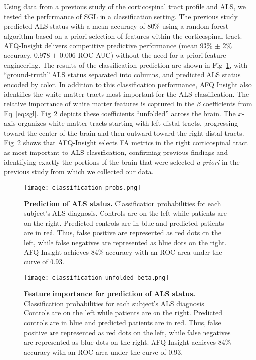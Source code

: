 Using data from a previous study of the corticospinal tract profile and
ALS\cite{sarica2017corticospinal}, we tested the performance of SGL in a
classification setting. The previous study predicted ALS status with a mean
accuracy of 80\% using a random forest algorithm based on a priori selection of
features within the corticospinal tract. AFQ-Insight delivers competitive
predictive performance (mean 93\% $\pm$ 2\% accuracy, 0.978 $\pm$ 0.006 ROC
AUC) without the need for a priori feature engineering. The results of the
classification prediction are shown in Fig~\ref{fig:class-results}, with
``ground-truth'' ALS status separated into columns, and predicted ALS status
encoded by color. In addition to this classification performance, AFQ Insight
also identifies the white matter tracts most important for the ALS
classification. The relative importance of white matter features is captured in
the $\beta$ coefficients from Eq~\eqref{eq:sgl}. Fig~\ref{fig:class-beta}
depicts these coefficients ``unfolded'' across the brain. The $x$-axis organizes
white matter tracts starting with left distal tracts, progressing toward the
center of the brain and then outward toward the right distal tracts.
Fig~\ref{fig:class-beta} shows that AFQ-Insight selects FA metrics in the right
corticospinal tract as most important to ALS classification, confirming previous
findings\cite{van2011upper, toosy2003diffusion, sarica2014tractography,
sage2007quantitative, sage2009quantitative, karlsborg2004corticospinal,
ellis1999diffusion, cosottini2005diffusion, ciccarelli2009investigation,
abe2010voxel} and identifying exactly the portions of the brain that were
selected \emph{a priori} in the previous study from which we collected our
data\cite{sarica2017corticospinal}.

\begin{figure}[!h]
    \centering
    \texttt{[image: classification\_probs.png]}
    \caption{{\bf Prediction of ALS status.}
        Classification probabilities for each subject's ALS diagnosis. Controls are on the left while patients are on the right. Predicted controls are in blue and predicted patients are in red. Thus, false positive are represented as red dots on the left, while false negatives are represented as blue dots on the right. AFQ-Insight achieves 84\% accuracy with an ROC area under the curve of 0.93.
    }
    \label{fig:class-results}
\end{figure}

\begin{figure}[!h]
    \centering
    \texttt{[image: classification\_unfolded\_beta.png]}
    \caption{{\bf Feature importance for prediction of ALS status.}
        Classification probabilities for each subject's ALS diagnosis. Controls are on the left while patients are on the right. Predicted controls are in blue and predicted patients are in red. Thus, false positive are represented as red dots on the left, while false negatives are represented as blue dots on the right. AFQ-Insight achieves 84\% accuracy with an ROC area under the curve of 0.93.
    }
    \label{fig:class-beta}
\end{figure}

